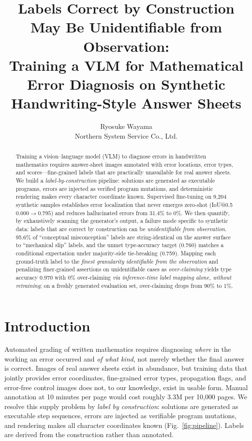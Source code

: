 \documentclass[11pt]{article}
\title{\textbf{Labels Correct by Construction May Be Unidentifiable from Observation:\\ Training a VLM for Mathematical Error Diagnosis on Synthetic Handwriting-Style Answer Sheets}}
\author{Ryosuke Wayama\\ Northern System Service Co., Ltd.}
\date{}
\begin{document}
\maketitle

\begin{abstract}
Training a vision--language model (VLM) to diagnose errors in handwritten mathematics requires answer-sheet images annotated with error locations, error types, and scores---fine-grained labels that are practically unavailable for real answer sheets. We build a \emph{label-by-construction} pipeline: solutions are generated as executable programs, errors are injected as verified program mutations, and deterministic rendering makes every character coordinate known. Supervised fine-tuning on 9{,}204 synthetic samples establishes error localization that never emerges zero-shot (IoU@0.5 $0.000 \rightarrow 0.795$) and reduces hallucinated errors from 31.4\% to 0\%. We then quantify, by exhaustively scanning the generator's output, a failure mode specific to synthetic data: labels that are correct by construction can be \emph{unidentifiable from observation}. 95.6\% of ``conceptual misconception'' labels are string-identical on the answer surface to ``mechanical slip'' labels, and the unmet type-accuracy target (0.760) matches a conditional expectation under majority-side tie-breaking (0.759). Mapping each ground-truth label to the \emph{finest granularity identifiable from the observation} and penalizing finer-grained assertions on unidentifiable cases as \emph{over-claiming} yields type accuracy 0.970 with 0\% over-claiming \emph{via inference-time label mapping alone, without retraining}; on a freshly generated evaluation set, over-claiming drops from 90\% to 1\%.
\end{abstract}

\section{Introduction}
Automated grading of written mathematics requires diagnosing \emph{where} in the working an error occurred and \emph{of what kind}, not merely whether the final answer is correct. Images of real answer sheets exist in abundance, but training data that jointly provides error coordinates, fine-grained error types, propagation flags, and error-free control images does not, to our knowledge, exist in usable form. Manual annotation at 10 minutes per page would cost roughly \yen 3.3M per 10{,}000 pages. We resolve this supply problem by \emph{label by construction}: solutions are generated as executable step sequences, errors are injected as verifiable program mutations, and rendering makes all character coordinates known (Fig.~\ref{fig:pipeline}). Labels are derived from the construction rather than annotated.
\end{document}
